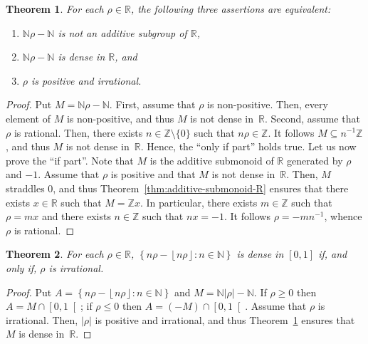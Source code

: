 \documentclass[12pt]{article}
\newcommand{\bZ}{\mathbb{Z}}
\newcommand{\bN}{\mathbb{N}} %
\newcommand{\bR}{\mathbb{R}}
\newcommand{\floor}[1]{\left\lfloor #1  \right\rfloor}
\newcommand{\abs}[1]{\left| #1 \right|}
\newtheorem{theorem}{Theorem}
\theoremstyle{definition}
\begin{document}

 \begin{theorem} \label{thm:Nr-N}
   For each $\rho \in \bR$,
   the following three assertions are equivalent:
     \begin{enumerate}
     \item $\bN \rho - \bN$ is not an additive subgroup of $\bR$, \label{ass:Nr-N:discrete}
     \item $\bN \rho - \bN$ is dense in $\bR$, and  \label{ass:Nr-N:dense}
    \item  $\rho$ is positive and irrational. \label{ass:Nr-N:irrational}
    \end{enumerate} 
\end{theorem}

\begin{proof}
  Put $M = \bN \rho - \bN$.
  First, assume that $\rho$ is non-positive.
  Then, every element of $M$ is non-positive, and thus $M$ is not dense in~$\bR$.
  Second, assume that $\rho$ is rational.
  Then, there exists $n \in \bZ \setminus \{ 0 \}$ such that $n \rho \in \bZ$.
  It follows $M \subseteq n^{-1} \bZ$, and thus $M$ is not dense in~$\bR$.
  Hence, the ``only if part'' holds true.
  Let us now prove the ``if part''.
  Note that $M$ is the additive submonoid of $\bR$ generated by $\rho$ and $- 1$.
  Assume that $\rho$ is positive and that $M$ is not dense in~$\bR$.
  Then, $M$ straddles $0$,
  and thus Theorem~\ref{thm:additive-submonoid-R} ensures that there exists $x \in \bR$ such that $M = \bZ x$.
  In particular, there exists $m \in \bZ$ such that $\rho = m x$ and there exists $n \in \bZ$ such that $n x = - 1$.
  It follows $\rho = - m n^{-1}$, whence $\rho$ is rational.
\end{proof}

\begin{theorem}
  For each $\rho \in \bR$,
   $\left\{ n \rho - \floor{n \rho} : n \in \bN \right\}$ is dense in $[0, 1]$ if, and only if,
   $\rho$ is irrational.
 \end{theorem}

 \begin{proof}
   Put
   $A = \left\{ n \rho - \floor{n \rho} : n \in \bN \right\}$ and $M = \bN \abs{ \rho } - \bN$.
   If $\rho \ge 0$ then $A = M \cap \left[0, 1 \right[$;
   if $\rho \le 0$ then $A = (- M) \cap \left[0, 1 \right[$.
   Assume that $\rho$ is irrational.
   Then, $\abs{\rho}$ is positive and irrational, and thus Theorem~\ref{thm:Nr-N} ensures that $M$ is dense in~$\bR$.
   
   
   
  \end{proof}
 

 



\end{document}
